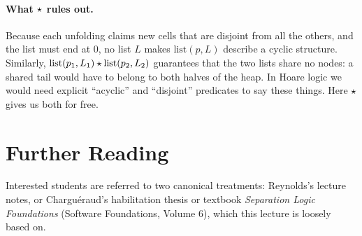 \paragraph{What $\mathbin{\star}$ rules out.} Because each unfolding claims new cells that are disjoint from
all the others, and the list must end at $0$, no list $L$ makes $\mathrm{list}(p,L)$ describe a
cyclic structure. Similarly, $\mathrm{list}(p_1,L_1)\mathbin{\star}\mathrm{list}(p_2,L_2)$ guarantees that the
two lists share no nodes: a shared tail would have to belong to both halves of the heap. In Hoare
logic we would need explicit ``acyclic'' and ``disjoint'' predicates to say these things. Here
$\mathbin{\star}$ gives us both for free.
%
\section*{Further Reading}
%
Interested students are referred to two canonical treatments: Reynolds's lecture notes, or
Chargu\'eraud's habilitation thesis or textbook \emph{Separation Logic Foundations} (Software
Foundations, Volume 6), which this lecture is loosely based on.
%
% 
